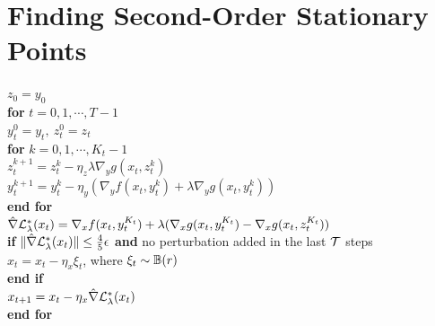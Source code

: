 \documentclass[twoside,11pt]{article}
\begin{document}



\section{Finding Second-Order Stationary Points} \label{sec:second}


\begin{algorithm*}[t]  
\caption{Perturbed F${}^2$BA $(x_0,y_0)$} \label{alg:PF2BA}
\begin{algorithmic}[1] 
\STATE $ z_0 = y_0$ \\[1mm]
\STATE \textbf{for} $ t =0,1,\cdots,T-1 $ \\[1mm]
\STATE \quad $ y_t^0 =  y_{t}, ~ z_t^0 = z_{t}$ \\[1mm]
\STATE \quad \textbf{for} $ k =0,1,\cdots,K_t-1$ \\[1mm]
\STATE \quad \quad $ z_t^{k+1} = z_t^{k}- \eta_z \lambda \nabla_y g(x_t, z_t^k)   $ \\[1mm]
\STATE \quad \quad $ y_t^{k+1} = y_t^k - \eta_y \left( \nabla_y f(x_t,y_t^k) +  \lambda  \nabla_y g(x_t,y_t^k) \right)$ \\[1mm]
\STATE \quad \textbf{end for} \\[1mm]
\STATE \quad $ \hat \nabla {\mathcal{L}}_{\lambda}^*(x_t)= \nabla_x f(x_t,y_{t}^{K_t}) + \lambda ( \nabla_x g(x_t,y_{t}^{K_t}) - \nabla_x g(x_t,z_{t}^{K_t}) )$ \\[1mm]
\STATE \quad \textbf{if} $ \Vert \hat \nabla {\mathcal{L}}_{\lambda}^*(x_t) \Vert \le \frac{4}{5} \epsilon$ \textbf{and} no perturbation added in the last ${\mathcal{T}}  $ steps \\[1mm]
\STATE \quad \quad $x_{t} = x_t - \eta_x \xi_t $, where $\xi_t \sim {\mathbb{B}}(r)$  \\[1mm]
\STATE \quad \textbf{end if} \\[1mm]
\STATE \quad $x_{t+1} = x_t -  \eta_x  \hat \nabla {\mathcal{L}}_{\lambda}^*(x_t)$ \\[1mm]
\STATE \textbf{end for} \\[1mm]
\end{algorithmic}
\end{algorithm*}
\end{document}
